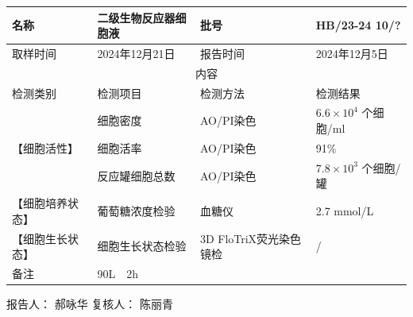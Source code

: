 \documentclass[UTF8,10pt,a4paper,fontset=fandol]{ctexart}
\newcommand{\fieldvalue}[1]{#1}
\newcommand{\handwritten}[1]{#1}
\begin{document}
\noindent
\begin{tabular}{|p{2.0cm}|p{5.0cm}|p{2.0cm}|p{5.0cm}|}
\hline
名称 &
\fieldvalue{二级生物反应器细胞液} &
批号 &
\fieldvalue{\handwritten{HB/23-24 10/?}}\\
\hline
取样时间 &
\fieldvalue{\handwritten{2024年12月21日}} &
报告时间 &
\fieldvalue{\handwritten{2024年12月5日}}\\
\hline
\multicolumn{4}{|c|}{内容}\\
\hline
检测类别 & 检测项目 & 检测方法 & 检测结果\\
\hline
\multirow{3}{*}{【细胞活性】}
& 细胞密度 & AO/PI染色 &
\fieldvalue{\handwritten{$6.6\times10^{4}$}} 个细胞/ml\\
\cline{2-4}
& 细胞活率 & AO/PI染色 &
\fieldvalue{\handwritten{91}}\%\\
\cline{2-4}
& 反应罐细胞总数 & AO/PI染色 &
\fieldvalue{\handwritten{$7.8\times10^{3}$}} 个细胞/罐\\
\hline
【细胞培养状态】 & 葡萄糖浓度检验 & 血糖仪 &
\fieldvalue{\handwritten{2.7}} mmol/L\\
\hline
\multirow{1}{*}{【细胞生长状态】}
& 细胞生长状态检验 & 3D FloTriX荧光染色镜检 &
\fieldvalue{\handwritten{/}}\\
\hline
备注 &
\multicolumn{3}{l|}{
\fieldvalue{\handwritten{90L　2h}}
}\\
\hline
\end{tabular}

\vspace{8mm}

\noindent
报告人：
\fieldvalue{\handwritten{郝咏华}}
\hfill
复核人：
\fieldvalue{\handwritten{陈丽青}}
\end{document}
